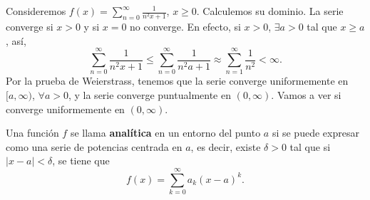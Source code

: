 \begin{eg}
\normalfont Consideremos $\displaystyle f\left(x\right) = \sum^{\infty}_{n = 0}\frac{1}{n^{2}x + 1} $, $\displaystyle x \geq 0 $. Calculemos su dominio. 
La serie converge si $\displaystyle x > 0 $ y si $\displaystyle x = 0 $ no converge. En efecto, si $\displaystyle x > 0 $, $\displaystyle \exists a > 0 $ tal que $\displaystyle x \geq a $, así, 
\[\sum^{\infty}_{n = 0}\frac{1}{n^{2}x + 1} \leq \sum^{\infty}_{n = 0}\frac{1}{n^{2}a + 1} \approx \sum^{\infty}_{n = 1}\frac{1}{n^{2}} < \infty .\]
Por la prueba de Weierstrass, tenemos que la serie converge uniformemente en $\displaystyle [a,\infty) $, $\displaystyle \forall a > 0 $, y la serie converge puntualmente en $\displaystyle (0,\infty) $. Vamos a ver si converge uniformemente en $\displaystyle \left(0,\infty\right) $.
\end{eg}
\begin{fdefinition}
\normalfont Una función $\displaystyle f $ se llama \textbf{analítica} en un entorno del punto $\displaystyle a $ si se puede expresar como una serie de potencias centrada en $\displaystyle a $, es decir, existe $\displaystyle \delta > 0 $ tal que si $\displaystyle \left|x-a\right|<\delta  $, se tiene que 
\[f\left(x\right) = \sum^{\infty}_{ k= 0}a_{k}\left(x-a\right)^{k} .\]
\end{fdefinition}

